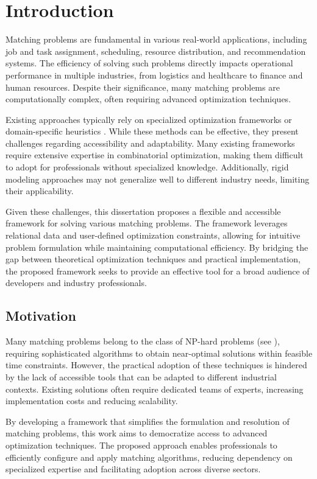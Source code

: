 \chapter{Introduction} \label{chap:introduction}

Matching problems are fundamental in various real-world applications, including job and task assignment, scheduling, resource distribution, and recommendation systems. The efficiency of solving such problems directly impacts operational performance in multiple industries, from logistics and healthcare to finance and human resources. Despite their significance, many matching problems are computationally complex, often requiring advanced optimization techniques.

Existing approaches typically rely on specialized optimization frameworks or domain-specific heuristics \cite{ieee_survey}. While these methods can be effective, they present challenges regarding accessibility and adaptability. Many existing frameworks require extensive expertise in combinatorial optimization, making them difficult to adopt for professionals without specialized knowledge. Additionally, rigid modeling approaches may not generalize well to different industry needs, limiting their applicability.

Given these challenges, this dissertation proposes a flexible and accessible framework for solving various matching problems. The framework leverages relational data and user-defined optimization constraints, allowing for intuitive problem formulation while maintaining computational efficiency. By bridging the gap between theoretical optimization techniques and practical implementation, the proposed framework seeks to provide an effective tool for a broad audience of developers and industry professionals.

\section{Motivation}
Many matching problems belong to the class of NP-hard problems (see \cite{karp1972reducibility}), requiring sophisticated algorithms to obtain near-optimal solutions within feasible time constraints. However, the practical adoption of these techniques is hindered by the lack of accessible tools that can be adapted to different industrial contexts. Existing solutions often require dedicated teams of experts, increasing implementation costs and reducing scalability.

By developing a framework that simplifies the formulation and resolution of matching problems, this work aims to democratize access to advanced optimization techniques. The proposed approach enables professionals to efficiently configure and apply matching algorithms, reducing dependency on specialized expertise and facilitating adoption across diverse sectors.

